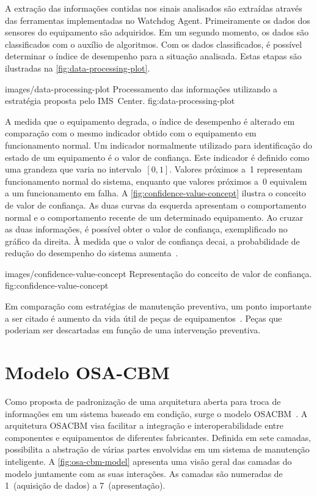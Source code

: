 A extração das informações contidas nos sinais analisados são extraídas através das ferramentas
implementadas no Watchdog Agent. Primeiramente os dados dos sensores do equipamento são adquiridos.
Em um segundo momento, os dados são classificados com o auxílio de algoritmos. Com os dados
classificados, é possível determinar o índice de desempenho para a situação analisada. Estas etapas
são ilustradas na \cref{fig:data-processing-plot}.

    {images/data-processing-plot}
    {Processamento das informações utilizando a estratégia proposta pelo IMS~Center.}
    {fig:data-processing-plot}

A medida que o equipamento degrada, o índice de desempenho é alterado em comparação com o mesmo
indicador obtido com o equipamento em funcionamento normal. Um indicador normalmente utilizado para
identificação do estado de um equipamento é o valor de confiança. Este indicador é definido como uma
grandeza que varia no intervalo~${[0,1]}$. Valores próximos a~\num{1} representam funcionamento
normal do sistema, enquanto que valores próximos a~\num{0} equivalem a um funcionamento em falha. A
\cref{fig:confidence-value-concept} ilustra o conceito de valor de confiança. As duas curvas da
esquerda apresentam o comportamento normal e o comportamento recente de um determinado equipamento.
Ao cruzar as duas informações, é possível obter o valor de confiança, exemplificado no gráfico da
direita. À medida que o valor de confiança decai, a probabilidade de redução do desempenho do
sistema aumenta~\cite{djurdjanovic2003watchdog}.

    {images/confidence-value-concept}
    {Representação do conceito de valor de confiança.}
    {fig:confidence-value-concept}



Em comparação com estratégias de manutenção preventiva, um ponto importante a ser citado é aumento
da vida útil de peças de equipamentos~\cite{lazzaretti2012avaliacao}. Peças que poderiam ser
descartadas em função de uma intervenção preventiva.


\section{Modelo OSA-CBM}

Como proposta de padronização de uma arquitetura aberta para troca de informações em um sistema
baseado em condição, surge o modelo \gls{OSACBM}~\cite{thurston2001open}. A arquitetura \gls{OSACBM}
visa facilitar a integração e interoperabilidade entre componentes e equipamentos de diferentes
fabricantes. Definida em sete camadas, possibilita a abstração de várias partes envolvidas em um
sistema de manutenção inteligente. A \cref{fig:osa-cbm-model} apresenta uma visão geral das camadas
do modelo juntamente com as suas interações. As camadas são numeradas de 1~(aquisição de dados) a
7~(apresentação).

